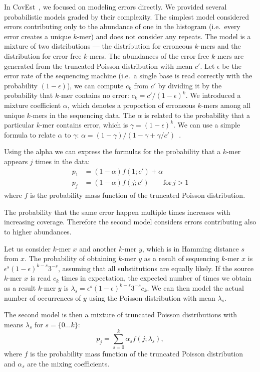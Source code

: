 In CovEst~\cite{covest}, we focused on modeling errors directly. We provided several probabilistic models graded by their complexity.
The simplest model considered errors contributing only to the abundance of one in the histogram (i.e.\ every error creates a unique $k$-mer) and does not consider any repeats.
The model is a mixture of two distributions --- the distribution for erroneous $k$-mers and the distribution for error free $k$-mers. The abundances of the error free $k$-mers are generated from the truncated Poisson distribution with mean $c'$.
Let $\epsilon$ be the error rate of the sequencing machine (i.e.\ a single base is read correctly with the probability $(1-\epsilon)$), we can compute $c_k$ from $c'$ by dividing it by the probability that $k$-mer contains no error: $c_k = c'/{(1-\epsilon)}^k$.
We introduced a mixture coefficient $\alpha$, which denotes a proportion of erroneous $k$-mers among all unique $k$-mers in the sequencing data. The $\alpha$ is related to the probability that a particular $k$-mer contains error, which is $\gamma = {(1-\epsilon)}^k$.
We can use a simple formula to relate $\alpha$ to $\gamma$: $\alpha = (1-\gamma)/(1-\gamma+\gamma/c')$~\cite{covest}.

Using the alpha we can express the formulas for the probability that a $k$-mer appears $j$ times in the data:
\begin{align*}
p_1 &= (1-\alpha) f(1; c') + \alpha \\
p_j &= (1-\alpha) f(j; c') \qquad\text{for}\, j>1
\end{align*}
where $f$ is the probability mass function of the truncated Poisson
distribution.

The probability that the same error happen multiple times increases with increasing coverage. Therefore the second model considers errors contributing also to higher abundances.

Let us consider $k$-mer $x$ and another $k$-mer $y$,
which is in Hamming distance $s$ from $x$. The probability of
obtaining $k$-mer $y$ as a result of sequencing $k$-mer $x$ is
$\epsilon^s {(1-\epsilon)}^{k-s} 3^{-s}$, assuming that all
substitutions are equally likely. If the source $k$-mer $x$ is read
$c_k$ times in expectation, the expected number of times we obtain as
a result $k$-mer $y$ is $\lambda_s = \epsilon^s {(1-\epsilon)}^{k-s}
3^{-s} c_k$. We can then model the actual number of occurrences of $y$ using the Poisson distribution with mean $\lambda_s$.

The second model is then a mixture of truncated Poisson distributions with means $\lambda_s$ for $s = \{0\dots k\}$:
$$p_j = \sum_{s=0}^k \alpha_s f(j; \lambda_s),$$
where $f$ is the probability mass function of the truncated Poisson
distribution and $\alpha_s$ are the mixing coefficients.

